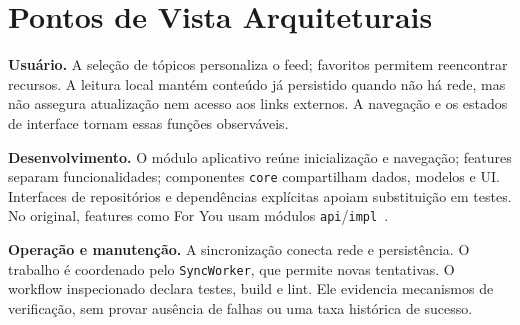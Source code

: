 \section{Pontos de Vista Arquiteturais}\label{sec:vistas}
\textbf{Usuário.} A seleção de tópicos personaliza o feed; favoritos permitem
reencontrar recursos. A leitura local mantém conteúdo já persistido quando
não há rede, mas não assegura atualização nem acesso aos links externos.
A navegação e os estados de interface tornam essas funções observáveis.

\textbf{Desenvolvimento.} O módulo aplicativo reúne inicialização e navegação;
features separam funcionalidades; componentes \texttt{core} compartilham dados,
modelos e UI. Interfaces de repositórios e dependências explícitas apoiam
substituição em testes. No original, features como For You usam módulos
\texttt{api}/\texttt{impl}~\cite{nia-modularizacao}.

\textbf{Operação e manutenção.} A sincronização conecta rede e persistência.
O trabalho é coordenado pelo \texttt{Sync\allowbreak Worker}, que permite novas tentativas.
O workflow inspecionado declara testes, build e lint. Ele evidencia mecanismos
de verificação, sem provar ausência de falhas ou uma taxa histórica de sucesso.
